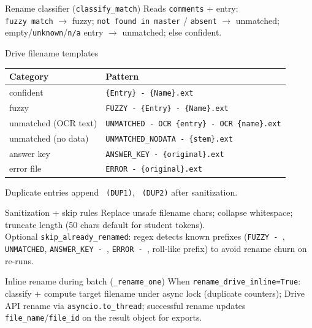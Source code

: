 \documentclass[aspectratio=169]{beamer}
\begin{document}
\begin{frame}{Rename classifier (\texttt{classify\_match})}
  \small
  Reads \texttt{comments} + entry:\\
  \texttt{fuzzy match} $\rightarrow$ fuzzy; \texttt{not found in master} / \texttt{absent} $\rightarrow$ unmatched; empty/\texttt{unknown}/\texttt{n/a} entry $\rightarrow$ unmatched; else confident.
\end{frame}

\begin{frame}{Drive filename templates}
  \tiny
  \begin{tabular}{@{}ll@{}}
    \toprule
    Category & Pattern \\
    \midrule
    confident & \texttt{\{Entry\} - \{Name\}.ext} \\
    fuzzy & \texttt{FUZZY - \{Entry\} - \{Name\}.ext} \\
    unmatched (OCR text) & \texttt{UNMATCHED - OCR \{entry\} - OCR \{name\}.ext} \\
    unmatched (no data) & \texttt{UNMATCHED\_NODATA - \{stem\}.ext} \\
    answer key & \texttt{ANSWER\_KEY - \{original\}.ext} \\
    error file & \texttt{ERROR - \{original\}.ext} \\
    \bottomrule
  \end{tabular}
\vfill
\tiny Duplicate entries append \texttt{ (DUP1)}, \texttt{ (DUP2)} after sanitization.
\end{frame}

\begin{frame}{Sanitization + skip rules}
  \small
  Replace unsafe filename chars; collapse whitespace; truncate length (50 chars default for student tokens).\\
  Optional \texttt{skip\_already\_renamed}: regex detects known prefixes (\texttt{FUZZY - }, \texttt{UNMATCHED}, \texttt{ANSWER\_KEY - }, \texttt{ERROR - }, roll-like prefix) to avoid rename churn on re-runs.
\end{frame}

\begin{frame}{Inline rename during batch (\texttt{\_rename\_one})}
  \small
  When \texttt{rename\_drive\_inline=True}: classify + compute target filename under async lock (duplicate counters); Drive API rename via \texttt{asyncio.to\_thread}; successful rename updates \texttt{file\_name}/\texttt{file\_id} on the result object for exports.
\end{frame}
\end{document}
